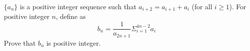 $\{a_n\}$ is a positive integer sequence such that $a_{i+2} = a_{i+1} +a_i$ (for all $i \ge 1$).
For positive integer $n$, define  as $$b_n=\frac{1}{a_{2n+1}}\Sigma_{i=1}^{4n-2}a_i$$Prove that $b_n$ is positive integer.